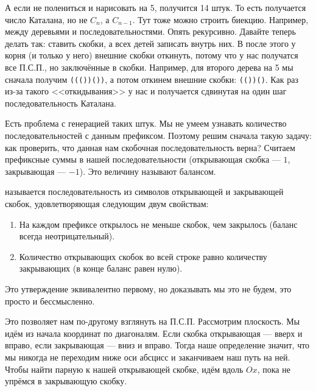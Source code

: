 \documentclass{article}
\begin{document}
\begin{itemize}
\begin{Comment}
\begin{center}
            \end{center}
            А если не полениться и нарисовать на 5, получится 14 штук. То есть получается число Каталана, но не $C_n$, а $C_{n-1}$. Тут тоже можно строить биекцию. Например, между деревьями и последовательностями. Опять рекурсивно. Давайте теперь делать так: ставить скобки, а всех детей записать внутрь них. В после этого у корня (и только у него) внешние скобки откинуть, потому что у нас получатся все П.С.П., но заключённые в скобки. Например, для второго дерева на 5 мы сначала получим \texttt{((())())}, а потом откинем внешние скобки: \texttt{(())()}. Как раз из-за такого <<откидывания>> у нас и получается сдвинутая на один шаг последовательность Каталана.
        \end{Comment}
        \begin{Comment}
            Есть проблема с генерацией таких штук. Мы не умеем узнавать количество последовательностей с данным префиксом. Поэтому решим сначала такую задачу: как проверить, что данная нам скобочная последовательность верна? Считаем префиксные суммы в нашей последовательности (открывающая скобка --- $1$, закрывающая --- $-1$). Это величину называют балансом.
        \end{Comment}
        \dfn {} называется последовательность из символов открывающей и закрывающей скобок, удовлетворяющая следующим двум свойствам:
        \begin{enumerate}
            \item На каждом префиксе открылось не меньше скобок, чем закрылось (баланс всегда неотрицательный).
            \item Количество открывающих скобок во всей строке равно количеству закрывающих (в конце баланс равен нулю).
        \end{enumerate}
        \thm Это утверждение эквивалентно первому, но доказывать мы это не будем, это просто и бессмысленно.
        \begin{Comment}
            Это позволяет нам по-другому взглянуть на П.С.П. Рассмотрим плоскость. Мы идём из начала координат по диагоналям. Если скобка открывающая --- вверх и вправо, если закрывающая --- вниз и вправо. Тогда наше определение значит, что мы никогда не переходим ниже оси абсцисс и заканчиваем наш путь на ней. Чтобы найти парную к нашей открывающей скобке, идём вдоль $Ox$, пока не упрёмся в закрывающую скобку.

\end{Comment}
\end{itemize}
\end{document}
